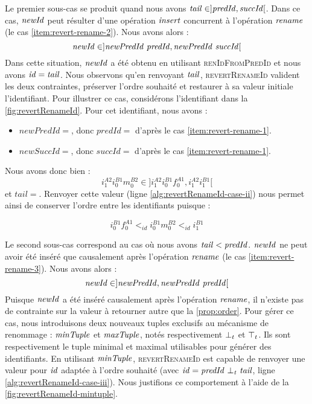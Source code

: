 Le premier sous-cas se produit quand nous avons $\mathit{tail} \in ]\mathit{predId}, \mathit{succId}[$.
Dans ce cas, $\mathit{newId}$ peut résulter d'une opération $\mathit{insert}$ concurrent à l'opération $\mathit{rename}$ (\ie le cas \ref{item:revert-rename-2}).
Nous avons alors :
\[\mathit{newId} \in ]\mathit{newPredId~predId}, \mathit{newPredId~succId}[\]
Dans cette situation, $\mathit{newId}$ a été obtenu en utilisant \textsc{renIdFromPredId} et nous avons $\mathit{id} = \mathit{tail}$.
Nous observons qu'en renvoyant $\mathit{tail}$, \textsc{revertRenameId} valident les deux contraintes, \ie préserver l'ordre souhaité et restaurer à sa valeur initiale l'identifiant.
Pour illustrer ce cas, considérons l'identifiant  dans la \autoref{fig:revertRenameId}.
Pour cet identifiant, nous avons :
\begin{itemize}
  \item $newPredId = $, donc $predId = $ d'après le cas \ref{item:revert-rename-1}.
  \item $newSuccId = $, donc $succId = $ d'après le cas \ref{item:revert-rename-1}.
\end{itemize}
Nous avons donc bien :
\[i^{A2}_{1}i^{B1}_{0}m^{B2}_{0} \in ]i^{A2}_{1}i^{B1}_{0}f^{A1}_{0}, i^{A2}_{1}i^{B1}_{1}[\]
et $tail = $.
Renvoyer cette valeur (ligne \ref{alg:revertRenameId-case-ii}) nous permet ainsi de conserver l'ordre entre les identifiants puisque :

\[i^{B1}_{0}f^{A1}_{0} <_{id} i^{B1}_{0}m^{B2}_{0} <_{id} i^{B1}_{1}\]

Le second sous-cas correspond au cas où nous avons $\mathit{tail} < \mathit{predId}$.
$\mathit{newId}$ ne peut avoir été inséré que causalement après l'opération $\mathit{rename}$ (\ie le cas \ref{item:revert-rename-3}).
Nous avons alors :
\[\mathit{newId} \in ]\mathit{newPredId}, \mathit{newPredId~predId}[\]
Puisque $\mathit{newId}$ a été inséré causalement après l'opération $\mathit{rename}$, il n'existe pas de contrainte sur la valeur à retourner autre que la \autoref{prop:order}.
Pour gérer ce cas, nous introduisons deux nouveaux tuples exclusifs au mécanisme de renommage : $\mathit{minTuple}$ et $\mathit{maxTuple}$, notés respectivement $\bot_t$ et $\top_t$.
Ils sont respectivement le tuple minimal et maximal utilisables pour générer des identifiants.
En utilisant $\mathit{minTuple}$, \textsc{revertRenameId} est capable de renvoyer une valeur pour $\mathit{id}$ adaptée à l'ordre souhaité (avec $\mathit{id} = \mathit{predId~\bot_t~tail}$, ligne \ref{alg:revertRenameId-case-iii}).
Nous justifions ce comportement à l'aide de la \autoref{fig:revertRenameId-mintuple}.

